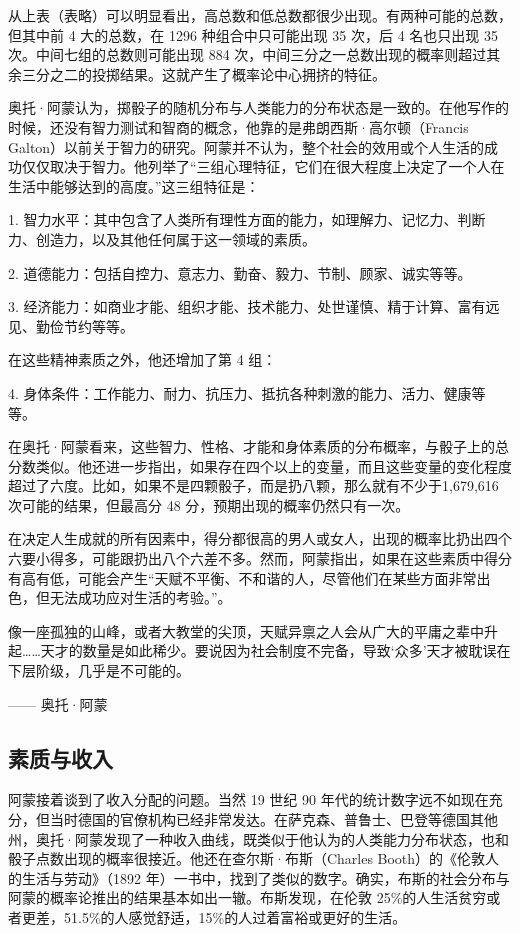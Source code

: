从上表（表略）可以明显看出，高总数和低总数都很少出现。有两种可能的总数，但其中前 4 大的总数，在 1296 种组合中只可能出现 35 次，后 4 名也只出现 35次。中间七组的总数则可能出现 884 次，中间三分之一总数出现的概率则超过其余三分之二的投掷结果。这就产生了概率论中心拥挤的特征。

奥托·阿蒙认为，掷骰子的随机分布与人类能力的分布状态是一致的。在他写作的时候，还没有智力测试和智商的概念，他靠的是弗朗西斯·高尔顿（Francis Galton）以前关于智力的研究。阿蒙并不认为，整个社会的效用或个人生活的成功仅仅取决于智力。他列举了“三组心理特征，它们在很大程度上决定了一个人在生活中能够达到的高度。”这三组特征是：

1. 智力水平：其中包含了人类所有理性方面的能力，如理解力、记忆力、判断力、创造力，以及其他任何属于这一领域的素质。

2. 道德能力：包括自控力、意志力、勤奋、毅力、节制、顾家、诚实等等。

3. 经济能力：如商业才能、组织才能、技术能力、处世谨慎、精于计算、富有远见、勤俭节约等等。 

在这些精神素质之外，他还增加了第 4 组：

4. 身体条件：工作能力、耐力、抗压力、抵抗各种刺激的能力、活力、健康等等。 

在奥托·阿蒙看来，这些智力、性格、才能和身体素质的分布概率，与骰子上的总分数类似。他还进一步指出，如果存在四个以上的变量，而且这些变量的变化程度超过了六度。比如，如果不是四颗骰子，而是扔八颗，那么就有不少于1,679,616 次可能的结果，但最高分 48 分，预期出现的概率仍然只有一次。

在决定人生成就的所有因素中，得分都很高的男人或女人，出现的概率比扔出四个六要小得多，可能跟扔出八个六差不多。然而，阿蒙指出，如果在这些素质中得分有高有低，可能会产生“天赋不平衡、不和谐的人，尽管他们在某些方面非常出色，但无法成功应对生活的考验。”。

\begin{tcolorbox}
\kaishu 像一座孤独的山峰，或者大教堂的尖顶，天赋异禀之人会从广大的平庸之辈中升起……天才的数量是如此稀少。要说因为社会制度不完备，导致‘众多’天才被耽误在下层阶级，几乎是不可能的。
\begin{flushright}
—— 奥托·阿蒙
\end{flushright}
\end{tcolorbox}


\subsection{素质与收入}
阿蒙接着谈到了收入分配的问题。当然 19 世纪 90 年代的统计数字远不如现在充分，但当时德国的官僚机构已经非常发达。在萨克森、普鲁士、巴登等德国其他州，奥托·阿蒙发现了一种收入曲线，既类似于他认为的人类能力分布状态，也和骰子点数出现的概率很接近。他还在查尔斯·布斯（Charles Booth）的《伦敦人的生活与劳动》（1892 年）一书中，找到了类似的数字。确实，布斯的社会分布与阿蒙的概率论推出的结果基本如出一辙。布斯发现，在伦敦 25\%的人生活贫穷或者更差，51.5\%的人感觉舒适，15\%的人过着富裕或更好的生活。


